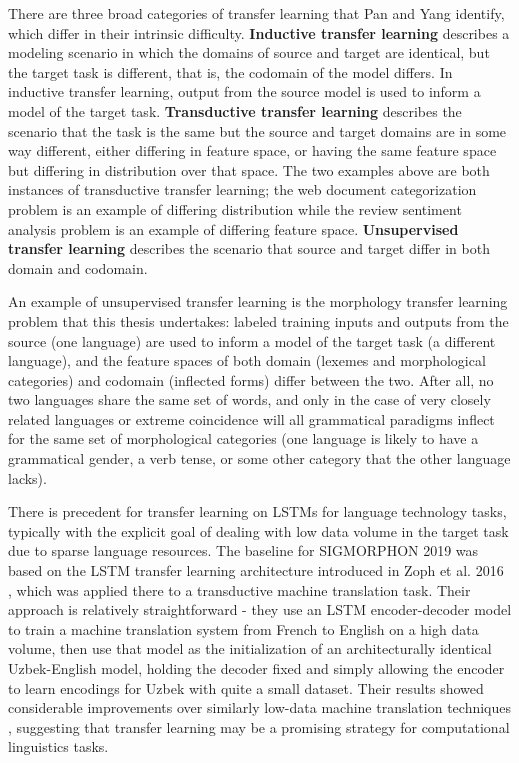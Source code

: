 There are three broad categories of transfer learning that Pan and Yang identify, which differ in their intrinsic difficulty. \textbf{Inductive transfer learning} describes a modeling scenario in which the domains of source and target are identical, but the target task is different, that is, the codomain of the model differs. In inductive transfer learning, output from the source model is used to inform a model of the target task. \textbf{Transductive transfer learning} describes the scenario that the task is the same but the source and target domains are in some way different, either differing in feature space, or having the same feature space but differing in distribution over that space. The two examples above are both instances of transductive transfer learning; the web document categorization problem is an example of differing distribution while the review sentiment analysis problem is an example of differing feature space. \textbf{Unsupervised transfer learning} describes the scenario that source and target differ in both domain and codomain. 

An example of unsupervised transfer learning is the morphology transfer learning problem that this thesis undertakes: labeled training inputs and outputs from the source (one language) are used to inform a model of the target task (a different language), and the feature spaces of both domain (lexemes and morphological categories) and codomain (inflected forms) differ between the two. After all, no two languages share the same set of words, and only in the case of very closely related languages or extreme coincidence will all grammatical paradigms inflect for the same set of morphological categories (one language is likely to have a grammatical gender, a verb tense, or some other category that the other language lacks).

There is precedent for transfer learning on LSTMs for language technology tasks, typically with the explicit goal of dealing with low data volume in the target task due to sparse language resources. The baseline for SIGMORPHON 2019 was based on the LSTM transfer learning architecture introduced in Zoph et al. 2016 \parencite{McCarthy2019}, which was applied there to a transductive machine translation task. Their approach is relatively straightforward - they use an LSTM encoder-decoder model to train a machine translation system from French to English on a high data volume, then use that model as the initialization of an architecturally identical Uzbek-English model, holding the decoder fixed and simply allowing the encoder to learn encodings for Uzbek with quite a small dataset. Their results showed considerable improvements over similarly low-data machine translation techniques \parencite{Zoph2016}, suggesting that transfer learning may be a promising strategy for computational linguistics tasks.

